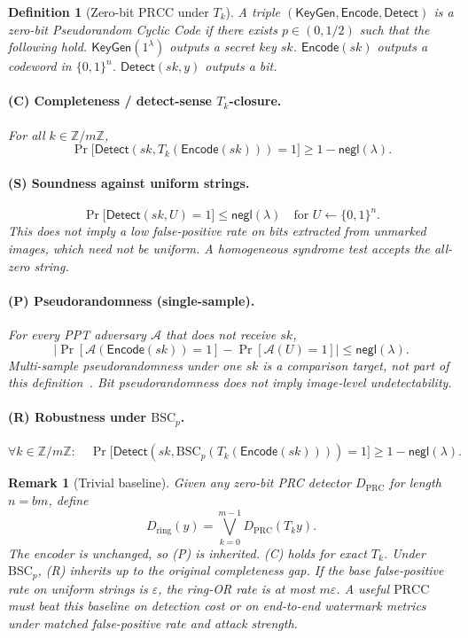 \documentclass[11pt,a4paper]{article}
\newtheorem{definition}[theorem]{Definition}
\newtheorem{remark}[theorem]{Remark}
\newcommand{\Enc}{\mathsf{Encode}}
\newcommand{\Det}{\mathsf{Detect}}
\newcommand{\KeyGen}{\mathsf{KeyGen}}
\newcommand{\negl}{\mathsf{negl}}
\newcommand{\BSC}{\mathrm{BSC}}
\newcommand{\PRCC}{\ensuremath{\mathrm{PRCC}}}
\newcommand{\sk}{\mathit{sk}}
\begin{document}
\begin{definition}[Zero-bit \PRCC{} under \(T_k\)]
\label{def:prcc}
A triple \((\KeyGen,\Enc,\Det)\) is a \emph{zero-bit Pseudorandom Cyclic Code} if
there exists \(p\in(0,1/2)\) such that the following hold.
\(\KeyGen(1^\lambda)\) outputs a secret key \(\sk\).
\(\Enc(\sk)\) outputs a codeword in \(\{0,1\}^n\).
\(\Det(\sk,y)\) outputs a bit.

\paragraph{(C) Completeness / detect-sense \(T_k\)-closure.}
For all \(k\in\mathbb{Z}/m\mathbb{Z}\),
\[
\Pr\bigl[\Det(\sk, T_k(\Enc(\sk)))=1\bigr]\ge 1-\negl(\lambda).
\]

\paragraph{(S) Soundness against uniform strings.}
\[
\Pr\bigl[\Det(\sk,U)=1\bigr]\le\negl(\lambda)
\quad\text{for }U\leftarrow\{0,1\}^n.
\]
This does not imply a low false-positive rate on bits extracted from unmarked
images, which need not be uniform.
A homogeneous syndrome test accepts the all-zero string.

\paragraph{(P) Pseudorandomness (single-sample).}
For every PPT adversary \(\mathcal{A}\) that does not receive \(\sk\),
\[
\bigl|\Pr[\mathcal{A}(\Enc(\sk))=1]-\Pr[\mathcal{A}(U)=1]\bigr|\le\negl(\lambda).
\]
Multi-sample pseudorandomness under one \(\sk\) is a comparison target, not part of
this definition~\cite{christ2024prc}.
Bit pseudorandomness does not imply image-level undetectability.

\paragraph{(R) Robustness under \(\BSC_p\).}
\[
\forall k\in\mathbb{Z}/m\mathbb{Z}:\quad
\Pr\bigl[\Det(\sk,\BSC_p(T_k(\Enc(\sk))))=1\bigr]\ge 1-\negl(\lambda).
\]
\end{definition}

\begin{remark}[Trivial baseline]
\label{rem:ringor}
Given any zero-bit PRC detector \(D_{\mathrm{PRC}}\) for length \(n=bm\), define
\[
D_{\mathrm{ring}}(y)=\bigvee_{k=0}^{m-1} D_{\mathrm{PRC}}(T_k y).
\]
The encoder is unchanged, so (P) is inherited.
(C) holds for exact \(T_k\).
Under \(\BSC_p\), (R) inherits up to the original completeness gap.
If the base false-positive rate on uniform strings is \(\varepsilon\), the ring-OR
rate is at most \(m\varepsilon\).
A useful \PRCC{} must beat this baseline on detection cost or on end-to-end
watermark metrics under matched false-positive rate and attack strength.
\end{remark}
\end{document}
